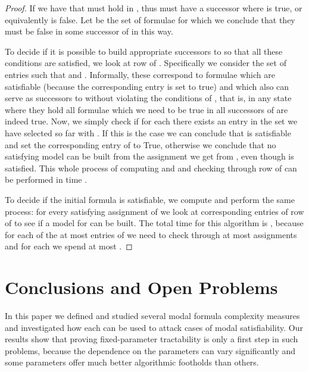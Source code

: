 \documentclass{llncs}
\begin{document}
\begin{proof}
If  we have that  must
hold in , thus  must have a successor where  is true, or equivalently
 is false. Let  be the set of formulae 
for which we conclude that they must be false in some successor of  in this way.

To decide if it is possible to build appropriate successors to 
so that all these conditions are satisfied, we look at row  of . Specifically
we consider the set of entries  such that  and
. Informally, these correspond to formulae which are satisfiable
(because the corresponding entry is set to true) and which also can serve as successors
to  without violating the conditions of , that is, in any state where they hold
all formulae which we need to be true in all successors of  are indeed true. Now, we
simply check if for each  there exists an entry in the set we have
selected so far with . If this is the case we can conclude that 
is satisfiable and set the corresponding entry of  to True, otherwise we conclude that
no satisfying model can be built from the assignment we get from , even though
 is satisfied. This whole process of computing  and 
and checking through row  of  can be performed in time .

To decide if the initial formula  is satisfiable, we compute  and
perform the same process: for every satisfying assignment of  we look at
corresponding entries of row  of  to see if a model for  can be built. The
total time for this algorithm is , because for each of the at most
 entries of  we need to check through at most  assignments and for each
we spend at most .



\end{proof}
 
\section{Conclusions and Open Problems}

In this paper we defined and studied several modal formula
complexity measures and investigated how each can be used to attack
cases of modal satisfiability. Our results show that proving
fixed-parameter tractability is only a first step in such problems,
because the dependence on the parameters can vary significantly and
some parameters offer much better algorithmic footholds than others.
\end{document}
